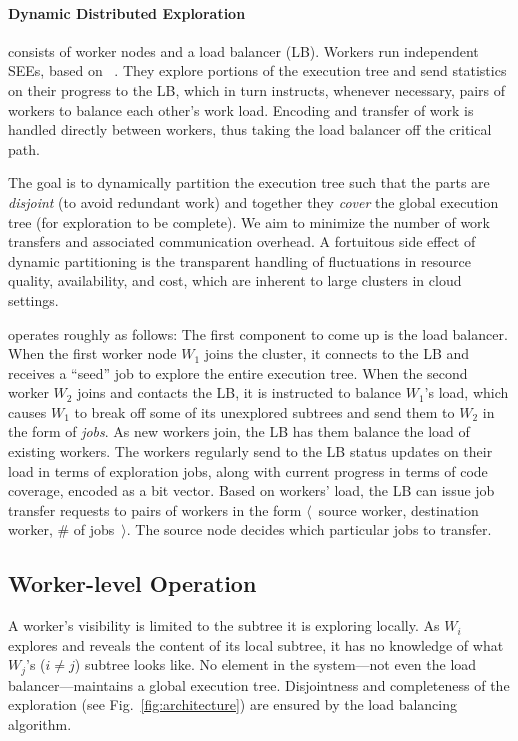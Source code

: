 \paragraph{Dynamic Distributed Exploration}

\cnine consists of wor\-ker nodes and a load balancer (LB).  Workers run independent SEEs, based on \klee~\cite{klee}.  They explore portions of the execution tree and send statistics on their progress to the LB, which in turn instructs, whenever necessary, pairs of workers to balance each other's work load.  Encoding and transfer of work is handled directly between workers, thus taking the load balancer off the critical path.

The goal is to dynamically partition the execution tree such that the parts are {\em disjoint} (to avoid redundant work) and together they {\em cover} the global execution tree (for exploration to be complete).  We aim to minimize the number of work transfers and associated communication overhead.  A fortuitous side effect of dynamic partitioning is the transparent handling of fluctuations in resource quality, availability, and cost, which are inherent to large clusters in cloud settings.

\cnine operates roughly as follows: The first component to come up is the load balancer.  When the first worker node $W_1$ joins the \cnine cluster, it connects to the LB and receives a ``seed'' job to explore the entire execution tree.  When the second worker $W_2$ joins and contacts the LB, it is instructed to balance $W_1$'s load, which causes $W_1$ to break off some of its unexplored subtrees and send them to $W_2$ in the form of {\em jobs}.  As new workers join, the LB has them balance the load of existing workers.  The workers regularly send to the LB status updates on their load in terms of exploration jobs, along with current progress in terms of code coverage, encoded as a bit vector.  Based on workers' load, the LB can issue job transfer requests to pairs of workers in the form $\langle$~source worker, destination worker, \# of jobs~$\rangle$.  The source node decides which particular jobs to transfer.

\subsection{Worker-level Operation}
\label{sec:workerView}

A worker's visibility is limited to the subtree it is exploring locally.  As $W_i$ explores and reveals the content of its local subtree, it has no knowledge of what $W_j$'s ($i\ne j$) subtree looks like.  No element in the system---not even the load balancer---maintains a global execution tree.  Disjointness and completeness 
of the exploration (see Fig.~\ref{fig:architecture}) are ensured by the load balancing algorithm.

